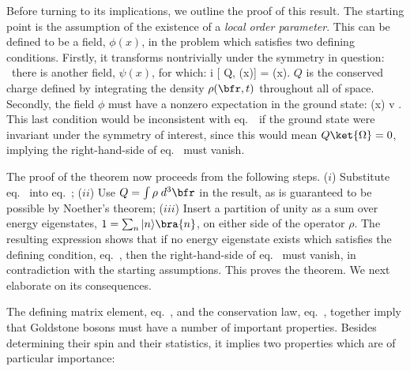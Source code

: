 \documentclass[12pt,epsf]{report}
\begin{document}
Before turning to its implications, we outline the proof of
this result. The starting point is the assumption of the
existence of a {\em local order parameter}. 
This can be defined to be a field, 
$\phi(x)$, in the problem which satisfies two defining
conditions. Firstly, it transforms nontrivially under the
symmetry in question: 
\ie\ there is another field, $\psi(x)$, for which:
%
\eq
\label{gbassone}
\delta \psi \equiv i [ Q, \psi(x)] = \phi(x). \eeq
%
$Q$ is the conserved charge defined by integrating the
density 
$\rho(\bfr,t)$ throughout all of space. Secondly, the field
$\phi$ must have a nonzero expectation in the ground state:
%
\eq
\label{gbasstwo}
\Avg{\phi} \equiv \bra{\Omega} \phi(x) \ket{\Omega}  \equiv
v .
\eeq
%
This last condition would be inconsistent with 
eq.~\  if the ground state were invariant
under the symmetry of interest, since this would mean $Q
\ket{\Omega} = 0$, implying the right-hand-side of
eq.~ must vanish.

The proof of the theorem now proceeds from the following
steps. ($i$) Substitute eq.~ into
eq.~; ($ii$) Use  $Q = \int \rho\; d^3\bfr$
in the result, as is guaranteed to be possible by Noether's
theorem; ($iii$) Insert a partition of unity as a sum over
energy eigenstates, $1 = \sum_n |
n \rangle \bra{n}$, on either side of the operator $\rho$.
The resulting expression shows that if no energy eigenstate exists
which satisfies the defining condition, eq.~,
then the right-hand-side of eq.~ must
vanish, in contradiction with the starting assumptions.
This proves the theorem. We next elaborate on its
consequences.

The defining matrix element, eq.~, and the
conservation law, eq.~, together imply
that Goldstone bosons must have a number of important
properties. Besides determining their spin and their
statistics, it implies two properties which are of
particular importance:
\end{document}
